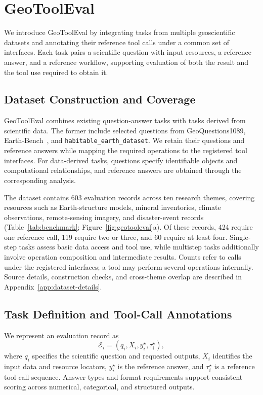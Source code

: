 \section{GeoToolEval}
\label{sec:benchmark}
We introduce GeoToolEval by integrating tasks from multiple geoscientific datasets and annotating their reference tool calls under a common set of interfaces. Each task pairs a scientific question with input resources, a reference answer, and a reference workflow, supporting evaluation of both the result and the tool use required to obtain it.

\subsection{Dataset Construction and Coverage}
\label{sec:benchmark-construction}
\label{sec:benchmark-composition}
GeoToolEval combines existing question-answer tasks with tasks derived from scientific data. The former include selected questions from GeoQuestions1089, Earth-Bench~\cite{feng2026earthagent}, and \nolinkurl{habitable_earth_dataset}. We retain their questions and reference answers while mapping the required operations to the registered tool interfaces. For data-derived tasks, questions specify identifiable objects and computational relationships, and reference answers are obtained through the corresponding analysis.

The dataset contains 603 evaluation records across ten research themes, covering resources such as Earth-structure models, mineral inventories, climate observations, remote-sensing imagery, and disaster-event records (Table~\ref{tab:benchmark}; Figure~\ref{fig:geotooleval}a). Of these records, 424 require one reference call, 119 require two or three, and 60 require at least four. Single-step tasks assess basic data access and tool use, while multistep tasks additionally involve operation composition and intermediate results. Counts refer to calls under the registered interfaces; a tool may perform several operations internally. Source details, construction checks, and cross-theme overlap are described in Appendix~\ref{app:dataset-details}.

\subsection{Task Definition and Tool-Call Annotations}
\label{sec:benchmark-design}
\label{sec:task-record}
We represent an evaluation record as
\begin{equation}
\mathcal{E}_i=(q_i,X_i,y_i^{\star},\tau_i^{\star}),
\label{eq:task-record}
\end{equation}
where $q_i$ specifies the scientific question and requested outputs, $X_i$ identifies the input data and resource locators, $y_i^{\star}$ is the reference answer, and $\tau_i^{\star}$ is a reference tool-call sequence. Answer types and format requirements support consistent scoring across numerical, categorical, and structured outputs.


